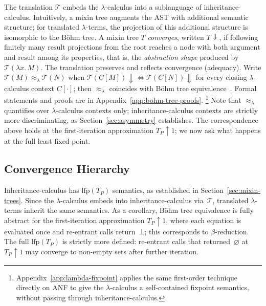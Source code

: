 The translation $\mathcal{T}$ embeds the $\lambda$-calculus
into a sublanguage of inheritance-calculus.
Intuitively, a mixin tree augments the AST with
additional semantic structure; for translated
$\lambda$-terms, the projection of this additional
structure is isomorphic to the B\"ohm tree.
A mixin tree $T$ \emph{converges}, written $T{\Downarrow}$,
if following finitely many $\mathrm{result}$ projections from
the root reaches a node with both $\mathrm{argument}$ and
$\mathrm{result}$ among its properties, that is, the \emph{abstraction shape}
produced by $\mathcal{T}(\lambda x.\, M)$.
The translation preserves and reflects convergence
(adequacy).
Write $\mathcal{T}(M) \approx_\lambda \mathcal{T}(N)$
when $\mathcal{T}(C[M]){\Downarrow} \Leftrightarrow
\mathcal{T}(C[N]){\Downarrow}$ for every closing
$\lambda$-calculus context $C[\cdot]$;
then $\approx_\lambda$ coincides with B\"ohm tree
equivalence~\cite{barendregt1984-lambda-calculus}.
Formal statements and proofs are in
Appendix~\ref{app:bohm-tree-proofs}.%
\footnote{
  Appendix~\ref{app:lambda-fixpoint} applies the same first-order
  technique directly on ANF to give the $\lambda$-calculus
  a self-contained fixpoint semantics, without passing
  through inheritance-calculus.
}
Note that $\approx_\lambda$ quantifies over $\lambda$-calculus
contexts only; inheritance-calculus contexts are strictly more
discriminating, as Section~\ref{sec:asymmetry} establishes.
The correspondence above holds at the first-iteration
approximation $T_P\!\uparrow\!1$; we now ask what happens
at the full least fixed point.

\subsection{Convergence Hierarchy}
\label{sec:convergence-hierarchy}

Inheritance-calculus has $\mathrm{lfp}(T_P)$ semantics,
as established in Section~\ref{sec:mixin-trees}.
Since the $\lambda$-calculus embeds into inheritance-calculus
via~$\mathcal{T}$, translated $\lambda$-terms inherit the
same semantics.
As a corollary, B\"ohm tree equivalence is fully abstract for
the first-iteration approximation $T_P\!\uparrow\!1$,
where each equation is evaluated once and re-entrant calls
return~$\bot$; this corresponds to $\beta$-reduction.
The full $\mathrm{lfp}(T_P)$ is strictly more defined:
re-entrant calls that returned~$\varnothing$ at
$T_P\!\uparrow\!1$ may converge to non-empty sets after
further iteration.

